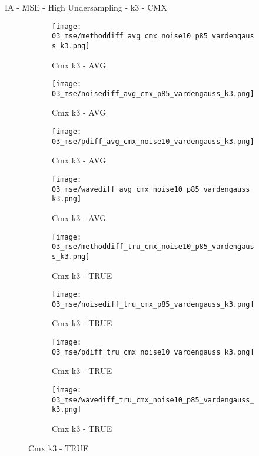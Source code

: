 \documentclass{beamer}
\begin{document}
\begin{frame}{IA - MSE - High Undersampling - k3 - CMX}{}
\begin{figure}
\begin{subfigure}{0.24\textwidth}
\texttt{[image: 03\_mse/methoddiff\_avg\_cmx\_noise10\_p85\_vardengauss\_k3.png]}
\vspace{-20pt}
\caption*{\tiny Cmx k3 - AVG}
\end{subfigure}
\begin{subfigure}{0.24\textwidth}
\texttt{[image: 03\_mse/noisediff\_avg\_cmx\_p85\_vardengauss\_k3.png]}
\vspace{-20pt}
\caption*{\tiny Cmx k3 - AVG}
\end{subfigure}
\begin{subfigure}{0.24\textwidth}
\texttt{[image: 03\_mse/pdiff\_avg\_cmx\_noise10\_vardengauss\_k3.png]}
\vspace{-20pt}
\caption*{\tiny Cmx k3 - AVG}
\end{subfigure}
\begin{subfigure}{0.24\textwidth}
\texttt{[image: 03\_mse/wavediff\_avg\_cmx\_noise10\_p85\_vardengauss\_k3.png]}
\vspace{-20pt}
\caption*{\tiny Cmx k3 - AVG}
\end{subfigure}

\begin{subfigure}{0.24\textwidth}
\texttt{[image: 03\_mse/methoddiff\_tru\_cmx\_noise10\_p85\_vardengauss\_k3.png]}
\vspace{-20pt}
\caption*{\tiny Cmx k3 - TRUE}
\end{subfigure}
\begin{subfigure}{0.24\textwidth}
\texttt{[image: 03\_mse/noisediff\_tru\_cmx\_p85\_vardengauss\_k3.png]}
\vspace{-20pt}
\caption*{\tiny Cmx k3 - TRUE}
\end{subfigure}
\begin{subfigure}{0.24\textwidth}
\texttt{[image: 03\_mse/pdiff\_tru\_cmx\_noise10\_vardengauss\_k3.png]}
\vspace{-20pt}
\caption*{\tiny Cmx k3 - TRUE}
\end{subfigure}
\begin{subfigure}{0.24\textwidth}
\texttt{[image: 03\_mse/wavediff\_tru\_cmx\_noise10\_p85\_vardengauss\_k3.png]}
\vspace{-20pt}
\caption*{\tiny Cmx k3 - TRUE}
\end{subfigure}
\end{figure}
\end{frame}
\end{document}
